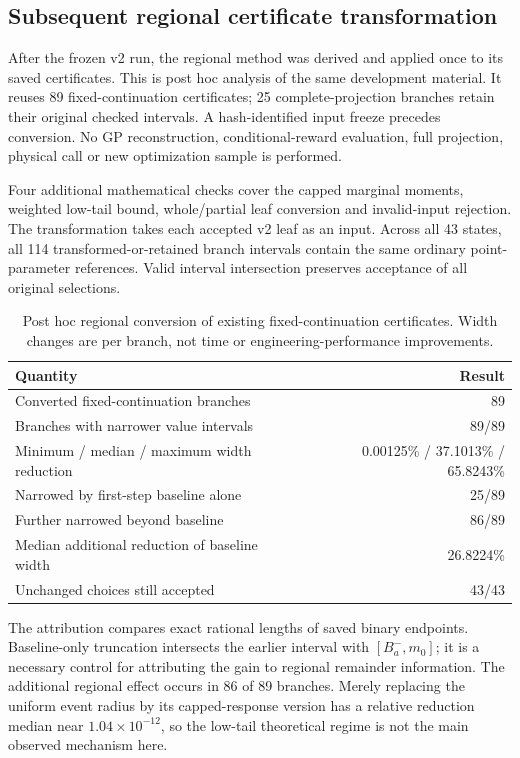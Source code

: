 \subsection{Subsequent regional certificate transformation}\label{sec:regional_results}

After the frozen v2 run, the regional method was derived and applied once to its saved certificates. This is post hoc analysis of the same development material. It reuses 89 fixed-continuation certificates; 25 complete-projection branches retain their original checked intervals. A hash-identified input freeze precedes conversion. No GP reconstruction, conditional-reward evaluation, full projection, physical call or new optimization sample is performed.

Four additional mathematical checks cover the capped marginal moments, weighted low-tail bound, whole/partial leaf conversion and invalid-input rejection. The transformation takes each accepted v2 leaf as an input. Across all 43 states, all 114 transformed-or-retained branch intervals contain the same ordinary point-parameter references. Valid interval intersection preserves acceptance of all original selections.

\begin{table}[htbp]\centering\small
\caption{Post hoc regional conversion of existing fixed-continuation certificates. Width changes are per branch, not time or engineering-performance improvements.}\label{tab:regional_conversion}
\begin{tabular}{lr}\toprule
Quantity & Result\\\midrule
Converted fixed-continuation branches & 89\\
Branches with narrower value intervals & 89/89\\
Minimum / median / maximum width reduction & 0.00125\% / 37.1013\% / 65.8243\%\\
Narrowed by first-step baseline alone & 25/89\\
Further narrowed beyond baseline & 86/89\\
Median additional reduction of baseline width & 26.8224\%\\
Unchanged choices still accepted & 43/43\\
\bottomrule\end{tabular}\end{table}

The attribution compares exact rational lengths of saved binary endpoints. Baseline-only truncation intersects the earlier interval with $[B_a^-,m_0]$; it is a necessary control for attributing the gain to regional remainder information. The additional regional effect occurs in 86 of 89 branches. Merely replacing the uniform event radius by its capped-response version has a relative reduction median near $1.04\times10^{-12}$, so the low-tail theoretical regime is not the main observed mechanism here.

